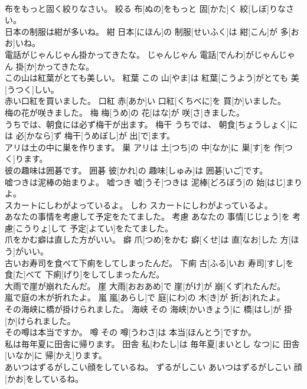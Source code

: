 \documentclass[8pt]{extreport}
\begin{document}
\begin{CJK}{UTF8}{min}
\\	布をもっと固く絞りなさい。	絞る	布[ぬの]をもっと 固[かた]く 絞[しぼ]りなさい。	
\\	日本の制服は紺が多いね。	紺	日本[にほん]の 制服[せいふく]は 紺[こん]が 多[おお]いね。	
\\	電話がじゃんじゃん掛かってきたな。	じゃんじゃん	電話[でんわ]がじゃんじゃん 掛[か]かってきたな。	
\\	この山は紅葉がとても美しい。	紅葉	この 山[やま]は 紅葉[こうよう]がとても 美[うつく]しい。	
\\	赤い口紅を買いました。	口紅	赤[あか]い 口紅[くちべに]を 買[か]いました。	
\\	梅の花が咲きました。	梅	梅[うめ]の 花[はな]が 咲[さ]きました。	
\\	うちでは、朝食には必ず梅干が出ます。	梅干	うちでは、 朝食[ちょうしょく]には 必[かなら]ず 梅干[うめぼし]が 出[で]ます。	
\\	アリは土の中に巣を作ります。	巣	アリは 土[つち]の 中[なか]に 巣[す]を 作[つく]ります。	
\\	彼の趣味は囲碁です。	囲碁	彼[かれ]の 趣味[しゅみ]は 囲碁[いご]です。	
\\	嘘つきは泥棒の始まりよ。	嘘つき	嘘[うそ]つきは 泥棒[どろぼう]の 始[はじ]まりよ。	
\\	スカートにしわがよっているよ。	しわ	スカートにしわがよっているよ。	
\\	あなたの事情を考慮して予定をたてました。	考慮	あなたの 事情[じじょう]を 考慮[こうりょ]して 予定[よてい]をたてました。	
\\	爪をかむ癖は直した方がいい。	癖	爪[つめ]をかむ 癖[くせ]は 直[なお]した 方[ほう]がいい。	
\\	古いお寿司を食べて下痢をしてしまったんだ。	下痢	古[ふる]いお 寿司[すし]を 食[た]べて 下痢[げり]をしてしまったんだ。	
\\	大雨で崖が崩れたんだ。	崖	大雨[おおあめ]で 崖[がけ]が 崩[くず]れたんだ。	
\\	嵐で庭の木が折れたよ。	嵐	嵐[あらし]で 庭[にわ]の 木[き]が 折[お]れたよ。	
\\	その海峡に橋が掛けられました。	海峡	その 海峡[かいきょう]に 橋[はし]が 掛[か]けられました。	
\\	その噂は本当ですか。	噂	その 噂[うわさ]は 本当[ほんとう]ですか。	
\\	私は毎年夏に田舎に帰ります。	田舎	私[わたし]は 毎年夏[まいとし なつ]に 田舎[いなか]に 帰[かえ]ります。	
\\	あいつはずるがしこい顔をしているね。	ずるがしこい	あいつはずるがしこい 顔[かお]をしているね。	

\end{CJK}
\end{document}
